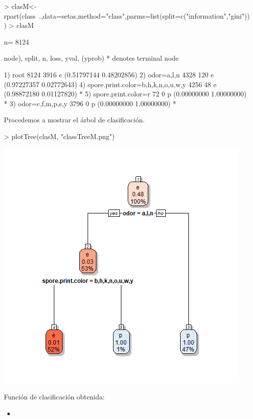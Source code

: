 \documentclass [a4paper] {article}
\begin{document}
\bigskip
\begin{Schunk}
\begin{Sinput}
> clasM<-rpart(class~.,data=setas,method="class",parms=list(split=c("information","gini")))
> clasM
\end{Sinput}
\begin{Soutput}
n= 8124 

node), split, n, loss, yval, (yprob)
      * denotes terminal node

1) root 8124 3916 e (0.51797144 0.48202856)  
  2) odor=a,l,n 4328  120 e (0.97227357 0.02772643)  
    4) spore.print.color=b,h,k,n,o,u,w,y 4256   48 e (0.98872180 0.01127820) *
    5) spore.print.color=r 72    0 p (0.00000000 1.00000000) *
  3) odor=c,f,m,p,s,y 3796    0 p (0.00000000 1.00000000) *
\end{Soutput}
\end{Schunk}

\bigskip
Procedemos a mostrar el árbol de clasificación.
\begin{Schunk}
\begin{Sinput}
> plotTree(clasM, "classTreeM.png")
\end{Sinput}
\end{Schunk}
\includegraphics[width=\textwidth]{classTreeM}

\bigskip
Función de clasificación obtenida:
\begin{itemize}
\item 
\end{itemize}
\end{document}
